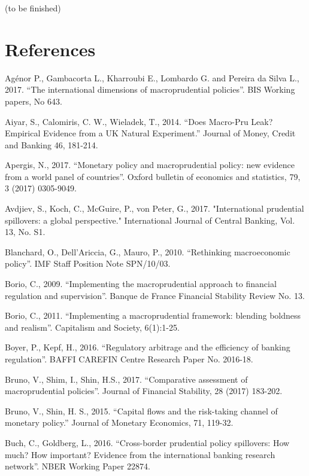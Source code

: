 \documentclass[12pt,a4paper]{article}
\begin{document}
(to be finished)
 
 \newpage
 \section*{References}
 
Agénor P., Gambacorta L., Kharroubi E., Lombardo G. and Pereira da Silva L., 2017. “The international dimensions of macroprudential policies”. BIS Working papers, No 643.

Aiyar, S., Calomiris, C. W., Wieladek, T., 2014. “Does Macro-Pru Leak? Empirical Evidence from a UK Natural Experiment.” Journal of Money, Credit and Banking 46, 181-214.

Apergis, N., 2017. “Monetary policy and macroprudential policy: new evidence from a world panel of countries”. Oxford bulletin of economics and statistics, 79, 3 (2017) 0305-9049.

Avdjiev, S., Koch, C., McGuire, P., von Peter, G., 2017. "International prudential spillovers: a global perspective." International Journal of Central Banking, Vol. 13, No. S1.

Blanchard, O., Dell’Ariccia, G., Mauro, P., 2010. “Rethinking macroeconomic policy”. IMF Staff Position Note SPN/10/03.


Borio, C., 2009. “Implementing the macroprudential approach to financial regulation and supervision”. Banque de France Financial Stability Review No. 13.

Borio, C., 2011. “Implementing a macroprudential framework: blending boldness and realism”. Capitalism and Society, 6(1):1-25.

Boyer, P., Kepf, H., 2016. “Regulatory arbitrage and the efficiency of banking regulation”. BAFFI CAREFIN Centre Research Paper No. 2016-18.

Bruno, V., Shim, I., Shin, H.S., 2017. “Comparative assessment of macroprudential policies”. Journal of Financial Stability, 28 (2017) 183-202.

Bruno, V., Shin, H. S., 2015. “Capital flows and the risk-taking channel of monetary policy.” Journal of Monetary Economics, 71, 119-32.

Buch, C., Goldberg, L., 2016. “Cross-border prudential policy spillovers: How much? How important? Evidence from the international banking research network”. NBER Working Paper 22874.
\end{document}
